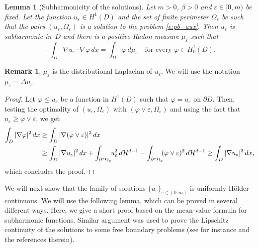 \documentclass[11pt]{article}
\numberwithin{equation}{section}
\theoremstyle{plain}
\newtheorem{lemma}[teo]{Lemma}
\theoremstyle{definition}
\newtheorem{oss}[teo]{Remark}
\let\eps\varepsilon
\def\HH{\mathcal{H}}
\begin{document}
\begin{lemma}[Subharmonicity of the solutions]\label{l:subharmonicity}
Let $m>0$, $\beta>0$ and $\eps\in[0,m)$ be fixed. Let the function $u_\eps\in H^1(D)$ and the set of finite perimeter $\Omega_\eps$ be such that the pairs $(u_\eps,\Omega_\eps)$ is a solution to the problem \eqref{e:pb_aux}. Then $u_\eps$ is subharmonic in~$D$ and there is a positive Radon measure $\mu_\eps$ such that
\[-\int_{D}\nabla u_\eps\cdot\nabla \varphi\,dx=\int_{D}\varphi\,d\mu_\eps\quad\text{for every } \varphi\in H^1_0(D).\]
\end{lemma}
\begin{oss}
$\mu_\eps$ is the distributional Laplacian of $u_\eps$. We will use the notation $\mu_\eps=\Delta u_\eps$.
\end{oss}
\begin{proof}
Let $\varphi\le u_\eps$ be a function in $H^1(D)$ such that $\varphi=u_\eps$ on $\partial D$. Then, testing the optimality of $(u_\eps,\Omega_\eps)$ with $(\varphi\vee\eps,\Omega_\eps)$ and using the fact that $u_\eps\ge \varphi\vee\eps$, we get
\begin{align*}
\int_D|\nabla \varphi|^2\,dx&\ge \int_D|\nabla (\varphi\vee \eps)|^2\,dx\\
&\ge \int_D|\nabla u_\eps|^2\,dx +\int_{\partial^\ast\Omega_\eps}\hspace*{-1mm}u_\eps^2\,d\HH^{d-1}-\int_{\partial^\ast\Omega_\eps}\hspace*{-1mm}(\varphi\vee \eps)^2\,d\HH^{d-1}\ge \int_D|\nabla u_\eps|^2\,dx,
\end{align*}
which concludes the proof.
\end{proof}

We will next show that the family of solutions $\big\{u_\eps\big\}_{\eps\in(0,m)}$ is uniformly Hölder continuous.
We will use the following lemma, which can be proved in several different ways. Here, we give a short proof based on the mean-value formula for subharmonic functions. Similar argument was used to prove the Lipschitz continuity of the solutions to some free boundary problems (see for instance \cite{velectures} and the references therein).
\end{document}

